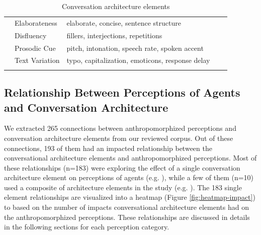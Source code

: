 \documentclass[sigconf,screen,review, anonymous]{acmart}
\newcommand{\cmt}[1]{}%
\begin{document}
\begin{table}[h]
{\begin{tabular}{@{}p{} | p{} | p{} | >{\centering}p{} | p{} @{}}
\\ \cline{2-5}
& Elaborateness & elaborate, concise, sentence structure & 6
& \cite{haas2022keep}\cmt{[78]}\cite{miehle2018exploring}\cmt{[51]}\cite{moilanen2022measuring}\cmt{[82]}\cite{roy2021users}\cmt{[71]}\cite{volkel2021manipulating}\cmt{[68]}\cite{volkel2022user}\cmt{[75]}
\\ \cline{2-5}
& Disfluency & fillers, interjections, repetitions & 6
& \cite{ceha2022expressive}\cmt{[77]}\cite{hu2021enhancing}\cmt{[56]}\cite{jeong2019exploring}\cmt{[10]}\cite{niewiadomski2013laugh}\cmt{[85]}\cite{wester2015artificial}\cmt{[14]}\cite{yang2021effect}\cmt{[72]}
\\ \Xhline{1.2pt}
\multirow{2}{*}{Non-Linguistic Format} & Prosodic Cue & pitch, intonation, speech rate, spoken accent & 12
& \cite{chan2021kinvoices}\cmt{[74]}\cite{choi2020nobody}\cmt{[54]}\cite{dubiel2020persuasive}\cmt{[60]}\cite{feijoo2021effects}\cmt{[70]}\cite{habler2019effects}\cmt{[63]}\cite{hu2021enhancing}\cmt{[56]}\cite{jestin2022effects}\cmt{[81]}\cite{kim2020can}\cmt{[24]}\cite{lubold2016effects}\cmt{[86]}\cite{misu2011toward}\cmt{[83]}\cite{tolmeijer2021female}\cmt{[62]}\cite{zhu2022effects}\cmt{[26]}
\\ \cline{2-5}
& Text Variation & typo, capitalization, emoticons, response delay & 9
& \cite{fadhil2018effect}\cmt{[52]}\cite{gnewuch2018faster}\cmt{[19]}\cite{gnewuch2018chatbot}\cmt{[21]}\cite{gnewuch2022opposing}\cmt{[20]}\cite{kim2019comparing}\cmt{[89]}\cite{seeger2021chatbots}\cmt{[35]}\cite{volkel2022user}\cmt{[75]}\cite{westerman2019believe}\cmt{[9]}\cite{wilhelm2022keep}\cmt{[28]}
\\ \Xhline{1.2pt}
\end{tabular}%
}
\caption{Conversation architecture elements}
\label{tab:cues}
\end{table}

\subsection{Relationship Between Perceptions of Agents and Conversation Architecture}

We extracted 265 connections between anthropomorphized perceptions and conversation architecture elements from our reviewed corpus. Out of these connections, 193 of them had an impacted relationship between the conversational architecture elements and anthropomorphized perceptions. Most of these relationships (n=183) were exploring the effect of a single conversation architecture element on perceptions of agents (e.g. \cite{miehle2018exploring}\cmt{[51]}\cite{westerman2019believe}\cmt{[9]}), while a few of them (n=10) used a composite of architecture elements in the study (e.g. \cite{seeger2021chatbots}\cmt{[35]}\cite{volkel2021manipulating}\cmt{[68]}). The 183 single element relationships are visualized into a heatmap (Figure \ref{fig:heatmap-impact}) to based on the number of impacts conversational architecture elements had on the anthropomorphized perceptions. These relationships are discussed in details in the following sections for each perception category.
\end{document}
